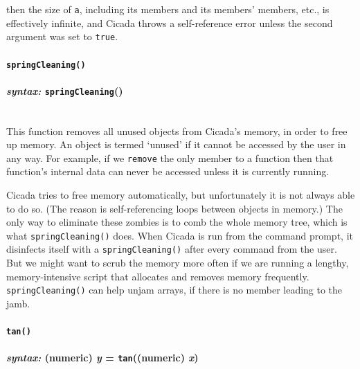 \documentclass{article}
\begin{document}
\noindent then the size of \texttt{a}, including its members and its members' members, etc., is effectively infinite, and Cicada throws a self-reference error unless the second argument was set to \verb#true#.\\







\paragraph{\texttt{springCleaning()}\\\\
\normalfont \emph{syntax: } \texttt{springCleaning}()\\\\}

This function removes all unused objects from Cicada's memory, in order to free up memory.  An object is termed `unused' if it cannot be accessed by the user in any way.  For example, if we \verb#remove# the only member to a function then that function's internal data can never be accessed unless it is currently running.

Cicada tries to free memory automatically, but unfortunately it is not always able to do so.  (The reason is self-referencing loops between objects in memory.)  The only way to eliminate these zombies is to comb the whole memory tree, which is what \texttt{springCleaning()} does.  When Cicada is run from the command prompt, it disinfects itself with a \texttt{springCleaning()} after every command from the user.  But we might want to scrub the memory more often if we are running a lengthy, memory-intensive script that allocates and removes memory frequently.  \verb#springCleaning()# can help unjam arrays, if there is no member leading to the jamb.\\







\paragraph{\texttt{tan()}\\\\
\normalfont \emph{syntax: } (numeric) \emph{y} = \texttt{tan}((numeric) \emph{x})\\\\}
\end{document}
